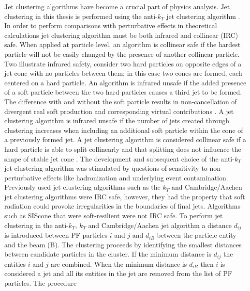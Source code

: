Jet clustering algorithms have become a crucial part of physics analysis.
Jet clustering in this thesis is performed using 
the anti-$k_{T}$ jet clustering algorithm \cite{Cacciari:2008gp}.
In order to perform 
comparisons with perturbative effects in theoretical calculations jet clustering algorithm
must be both infrared and collinear (IRC) safe. 
When applied at particle level, an algorithm is collinear safe if the hardest particle
will not be easily changed by the presence of another collinear particle. %
Two illustrate infrared safety, consider
 two hard particles on opposite edges of a jet cone with no particles between them; in this case
two cones are formed, each centered on a hard particle. An algorithm is infrared unsafe
if the added presence of a soft particle between the two hard particles causes a third jet 
to be formed. The difference with and without the soft particle results in non-cancellation
of divergent real soft production and corresponding virtual contributions \cite{InfraredUnsafe}.
A jet clustering algorithm is infrared unsafe if the number of jets created through clustering
increases when including an additional soft particle within the cone of a previously formed jet. 
A jet clustering algorithm is considered collinear safe if a hard particle is able to split 
collinearly and that splitting does not influence the shape of stable jet cone \cite{CollinearSafe}. 
The development and subsequent choice of the anti-$k_{T}$ jet clustering algorithm
was stimulated by questions of sensitivity to non-perturbative effects like hadronization
and underlying event contamination. Previously used jet clustering algorithms
such as the $k_{T}$ \cite{ktAlgo} %
and Cambridge/Aachen \cite{cambAachen} %
jet clustering algorithms were IRC safe, however, they
had the property that soft radiation could provoke irregularities in the boundaries
of final jets. 
Algorithms such as SIScone \cite{SISCone} %
that were soft-resilient were not IRC safe.
To perform jet clustering in the anti-$k_{T}$, $k_{T}$ and Cambridge/Aachen jet algorithm
a distance $d_{ij}$ is introduced between PF particles $i$ and $j$ and $d_{iB}$ between
the particle entity and the beam (B). The clustering proceeds by identifying the smallest distances
between candidate particles in the cluster.
If the minimum distance is $d_{ij}$ the entities $i$ and $j$ are combined. 
When the minimum distance is $d_{iB}$ then $i$ 
is considered a jet and all its entities in the jet are removed from the list of PF particles. The procedure
